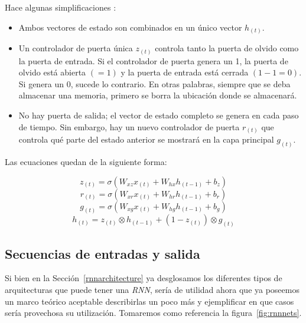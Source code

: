 \documentclass[a4paper,12pt]{article}
\begin{document}
Hace algunas simplificaciones \citep{geron}:

\begin{itemize}[noitemsep, topsep=2pt]
	\item Ambos vectores de estado son combinados en un único vector $h_{(t)}$.
	\item Un controlador de puerta única $z_{(t)}$ controla tanto la puerta de olvido como la puerta de entrada. Si el controlador de puerta genera un 1, la puerta de olvido está abierta $(=1)$ y la puerta de entrada está cerrada $(1-1=0)$. Si genera un 0, sucede lo contrario. En otras palabras, siempre que se deba almacenar una memoria, primero se borra la ubicación donde se almacenará.
	\item No hay puerta de salida; el vector de estado completo se genera en cada paso de tiempo. Sin embargo, hay un nuevo controlador de puerta $r_{(t)}$ que controla qué parte del estado anterior se mostrará en la capa principal $g_{(t)}$.
	      	      
\end{itemize}

Las ecuaciones quedan de la siguiente forma:

$$z_{(t)}=\sigma(W_{xz}x_{(t)} + W_{hx}h_{(t-1)} + b_z)$$
$$r_{(t)}=\sigma(W_{xr}x_{(t)} + W_{hr}h_{(t-1)} + b_r)$$
$$g_{(t)}=\sigma(W_{xg}x_{(t)} + W_{hg}h_{(t-1)} + b_g)$$
$$h_{(t)}=z_{(t)} \otimes h_{(t-1)} + (1-z_{(t)}) \otimes g_{(t)}$$

\subsection{Secuencias de entradas y salida}

Si bien en la Sección~\ref{rnnarchitecture} ya desglosamos los diferentes tipos de arquitecturas que puede tener una \textit{RNN}, sería de utilidad ahora que ya poseemos un marco teórico aceptable describirlas un poco más y ejemplificar en que casos sería provechosa su utilización. Tomaremos como referencia la figura~\ref{fig:rnnnets}.
\end{document}
